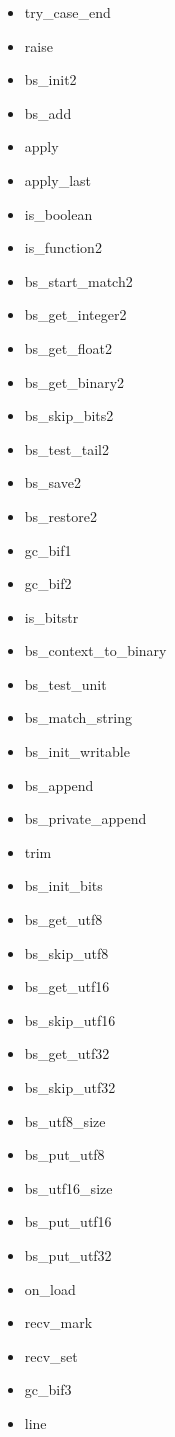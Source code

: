 \documentclass{article}
\begin{document}
\begin{multicols}{3}
\begin{itemize}
\item try\_case\_end
\item raise
\item bs\_init2
\item bs\_add
\item apply
\item apply\_last
\item is\_boolean
\item is\_function2
\item bs\_start\_match2
\item bs\_get\_integer2
\item bs\_get\_float2
\item bs\_get\_binary2
\item bs\_skip\_bits2
\item bs\_test\_tail2
\item bs\_save2
\item bs\_restore2
\item gc\_bif1
\item gc\_bif2
\item is\_bitstr
\item bs\_context\_to\_binary
\item bs\_test\_unit
\item bs\_match\_string
\item bs\_init\_writable
\item bs\_append
\item bs\_private\_append
\item trim
\item bs\_init\_bits
\item bs\_get\_utf8
\item bs\_skip\_utf8
\item bs\_get\_utf16
\item bs\_skip\_utf16
\item bs\_get\_utf32
\item bs\_skip\_utf32
\item bs\_utf8\_size
\item bs\_put\_utf8
\item bs\_utf16\_size
\item bs\_put\_utf16
\item bs\_put\_utf32
\item on\_load
\item recv\_mark
\item recv\_set
\item gc\_bif3
\item line
\end{itemize}
\end{multicols}
\end{document}
